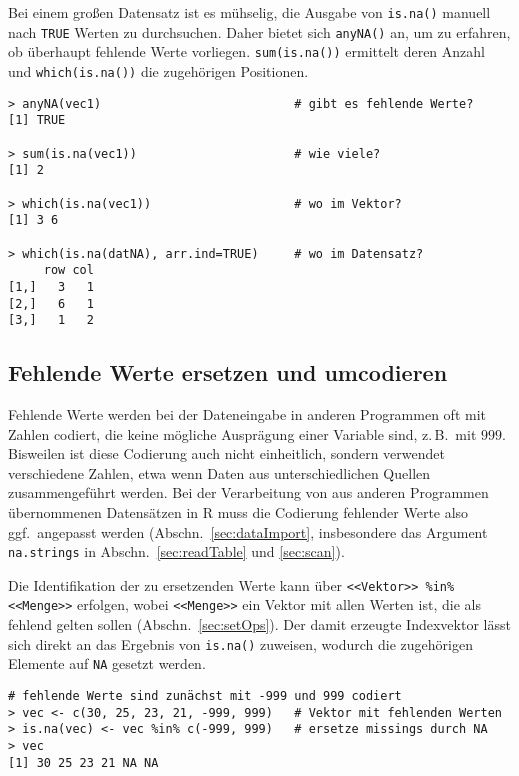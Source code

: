 Bei einem großen Datensatz ist es mühselig, die Ausgabe von \lstinline!is.na()! manuell nach \lstinline!TRUE! Werten zu durchsuchen. Daher bietet sich \lstinline!anyNA()! an, um zu erfahren, ob überhaupt fehlende Werte vorliegen. \lstinline!sum(is.na())! ermittelt deren Anzahl und \lstinline!which(is.na())! die zugehörigen Positionen.
\begin{lstlisting}
> anyNA(vec1)                           # gibt es fehlende Werte?
[1] TRUE

> sum(is.na(vec1))                      # wie viele?
[1] 2

> which(is.na(vec1))                    # wo im Vektor?
[1] 3 6

> which(is.na(datNA), arr.ind=TRUE)     # wo im Datensatz?
     row col
[1,]   3   1
[2,]   6   1
[3,]   1   2
\end{lstlisting}

\subsection{Fehlende Werte ersetzen und umcodieren}

Fehlende Werte werden bei der Dateneingabe in anderen Programmen oft mit Zahlen codiert, die keine mögliche Ausprägung einer Variable sind, z.\,B.\ mit $999$. Bisweilen ist diese Codierung auch nicht einheitlich, sondern verwendet verschiedene Zahlen, etwa wenn Daten aus unterschiedlichen Quellen zusammengeführt werden. Bei der Verarbeitung von aus anderen Programmen übernommenen Datensätzen in R muss die Codierung fehlender Werte also ggf.\ angepasst werden (Abschn.\ \ref{sec:dataImport}, insbesondere das Argument \lstinline!na.strings! in Abschn.\ \ref{sec:readTable} und \ref{sec:scan}).

Die Identifikation der zu ersetzenden Werte kann über \lstinline!<<Vektor>> %in% <<Menge>>! erfolgen, wobei \lstinline!<<Menge>>! ein Vektor mit allen Werten ist, die als fehlend gelten sollen (Abschn.\ \ref{sec:setOps}). Der damit erzeugte Indexvektor lässt sich direkt an das Ergebnis von \lstinline!is.na()! zuweisen, wodurch die zugehörigen Elemente auf \lstinline!NA! gesetzt werden.
\begin{lstlisting}
# fehlende Werte sind zunächst mit -999 und 999 codiert
> vec <- c(30, 25, 23, 21, -999, 999)   # Vektor mit fehlenden Werten
> is.na(vec) <- vec %in% c(-999, 999)   # ersetze missings durch NA
> vec
[1] 30 25 23 21 NA NA
\end{lstlisting}

